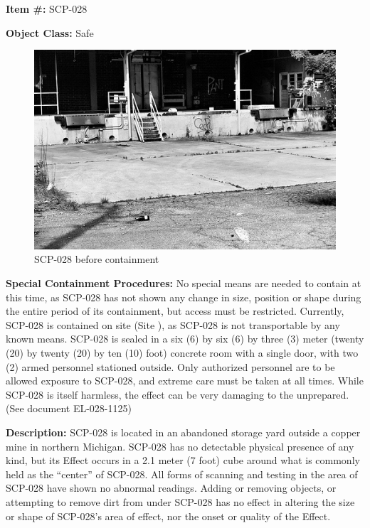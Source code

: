 
\textbf{Item \#:} SCP-028

\textbf{Object Class:} Safe

\begin{figure}[h]
\begin{center}
\includegraphics[scale=0.65]{scp/028.jpg}
\linebreak SCP-028 before containment
\end{center}
\end{figure}

\textbf{Special Containment Procedures:} No special means are needed to contain at this time, as SCP-028 has not shown any change in size, position or shape during the entire period of its containment, but access must be restricted. Currently, SCP-028 is contained on site (Site ), as SCP-028 is not transportable by any known means. SCP-028 is sealed in a six (6) by six (6) by three (3) meter (twenty (20) by twenty (20) by ten (10) foot) concrete room with a single door, with two (2) armed personnel stationed outside. Only authorized personnel are to be allowed exposure to SCP-028, and extreme care must be taken at all times. While SCP-028 is itself harmless, the effect can be very damaging to the unprepared. (See document EL-028-1125)

\textbf{Description:} SCP-028 is located in an abandoned storage yard outside a copper mine in northern Michigan. SCP-028 has no detectable physical presence of any kind, but its Effect occurs in a 2.1 meter (7 foot) cube around what is commonly held as the “center” of SCP-028. All forms of scanning and testing in the area of SCP-028 have shown no abnormal readings. Adding or removing objects, or attempting to remove dirt from under SCP-028 has no effect in altering the size or shape of SCP-028’s area of effect, nor the onset or quality of the Effect.


